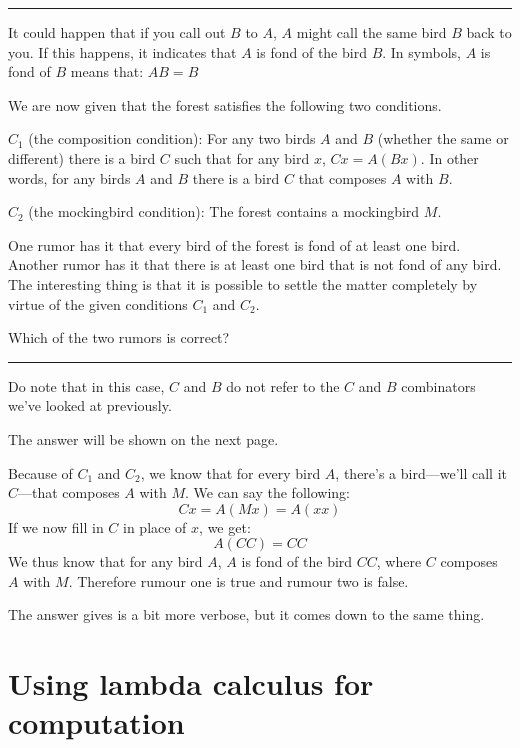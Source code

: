 \documentclass[11pt]{article}
\begin{document}
\setlength{\leftskip}{1cm}
\setlength{\rightskip}{1cm}
\begin{center}
\rule{15cm}{0.5pt}
\end{center}

It could happen that if you call out \(B\) to \(A\), \(A\) might call the same
bird \(B\) back to you. If this happens, it indicates that \(A\) is fond of the
bird \(B\). In symbols, \(A\) is fond of \(B\) means that: \(AB = B\)

We are now given that the forest satisfies the following two conditions. 

\(C_{1}\) (the composition condition): For any two birds \(A\) and \(B\)
(whether the same or different) there is a bird \(C\) such that for any bird
\(x\), \(Cx = A(Bx)\). In other words, for any birds \(A\) and \(B\) there is a
bird \(C\) that composes \(A\) with \(B\). 

\(C_{2}\) (the mockingbird condition): The forest contains a mockingbird \(M\). 

One rumor has it that every bird of the forest is fond of at least one bird.
Another rumor has it that there is at least one bird that is not fond of any
bird. The interesting thing is that it is possible to settle the matter
completely by virtue of the given conditions \(C_{1}\) and \(C_{2}\).

Which of the two rumors is correct? 

\begin{center}
\rule{15cm}{0.5pt}
\end{center}
\setlength{\leftskip}{0pt}
\setlength{\rightskip}{0pt}

Do note that in this case, \(C\) and \(B\) do not refer to the \(C\) and \(B\)
combinators we've looked at previously.

The answer will be shown on the next page.

\newpage

Because of \(C_{1}\) and \(C_{2}\), we know that for every bird \(A\), there's
a bird---we'll call it \(C\)---that composes \(A\) with \(M\). We can say the
following:
\[Cx=A(Mx)=A(xx)\] 
If we now fill in \(C\) in place of \(x\), we get:
\[A(CC)=CC\]
We thus know that for any bird \(A\), \(A\) is fond of the bird \(CC\), where
\(C\) composes \(A\) with \(M\). Therefore rumour one is true and rumour two is
false.

The answer \textcite{smullyan2000} gives is a bit more verbose, but it comes
down to the same thing.

\section{Using lambda calculus for computation}\label{computation}
\end{document}
